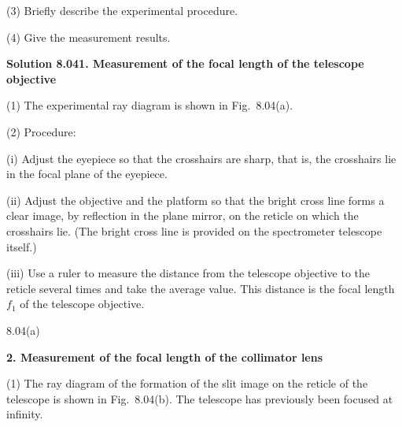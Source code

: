 (3) Briefly describe the experimental procedure.

(4) Give the measurement results.

\textbf{Solution 8.04}\quad \textbf{1. Measurement of the focal length of the telescope objective}

(1) The experimental ray diagram is shown in Fig.~8.04(a).

(2) Procedure:

(i) Adjust the eyepiece so that the crosshairs are sharp, that is, the crosshairs lie in the focal plane of the eyepiece.

(ii) Adjust the objective and the platform so that the bright cross line forms a clear image, by reflection in the plane mirror, on the reticle on which the crosshairs lie. (The bright cross line is provided on the spectrometer telescope itself.)

(iii) Use a ruler to measure the distance from the telescope objective to the reticle several times and take the average value. This distance is the focal length $f_1$ of the telescope objective.

\begin{figbox}{8.04(a)}
\end{figbox}

\textbf{2. Measurement of the focal length of the collimator lens}

(1) The ray diagram of the formation of the slit image on the reticle of the telescope is shown in Fig.~8.04(b). The telescope has previously been focused at infinity.

